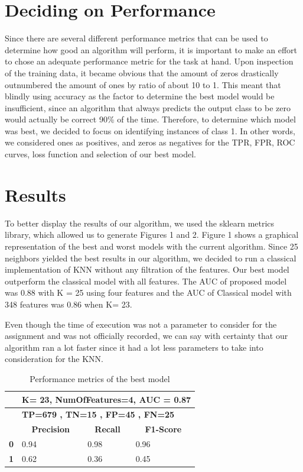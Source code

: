 \documentclass{article}
\begin{document}
\section{Deciding on Performance}  
Since there are several different performance metrics that can be used to determine how good an algorithm will perform, it is important to make an effort to chose an adequate performance metric for the task at hand. Upon inspection of the training data, it became obvious that the amount of zeros drastically outnumbered the amount of ones by ratio of about 10 to 1. This meant that blindly using accuracy as the factor to determine the best model would be insufficient, since an algorithm that always predicts the output class to be zero would actually be correct 90\% of the time. Therefore, to determine which model was best, we decided to focus on identifying instances of class 1. In other words, we considered ones as positives, and zeros as negatives for the TPR, FPR, ROC curves, loss function and selection of our best model.

 \section{Results}
To better display the results of our algorithm, we used the sklearn metrics library, which allowed us to generate Figures 1 and 2. Figure 1 shows a graphical representation of the best and worst models with the current algorithm. Since 25 neighbors yielded the best results in our algorithm, we decided to run a classical implementation of KNN without any filtration of the features. Our best model outperform the classical model with all features. The AUC of proposed model was 0.88 with K = 25  using four features and  the AUC of  Classical model with 348 features  was 0.86 when K= 23.

  Even though the time of execution was not a parameter to consider for the assignment and was not officially recorded, we can say with certainty that our algorithm ran a lot faster since it had a lot less parameters to take into consideration for the KNN. 

 \begin{table}[H]
\begin{tabular}{|l|l|l|l|}
\hline
           & \multicolumn{3}{l|}{\textbf{K= 23, NumOfFeatures=4, AUC = 0.87}}                                                    
            \\ \hline  
           & \multicolumn{3}{l|}{\textbf{ TP=679 , TN=15 , FP=45 , FN=25  }}                                                    
            \\ \hline  
            
           & \multicolumn{1}{c|}{\textbf{Precision}} & \multicolumn{1}{c|}{\textbf{Recall}} & \multicolumn{1}{c|}{\textbf{F1-Score}} \\ \hline
\textbf{0} & 0.94 & 0.98                                 & 0.96                                   \\ \hline
\textbf{1} & 0.62 & 0.36                                 & 0.45 \\ \hline
\end{tabular}
\caption{Performance metrics of the best model}
\end{table}
\end{document}
